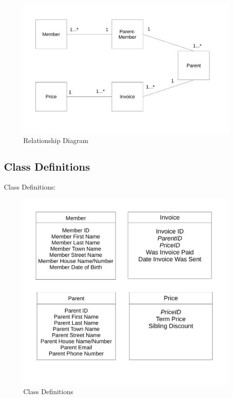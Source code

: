 \begin{figure}[H]
\includegraphics[width=\textwidth]{./Design/images/Relationship_Diagram.pdf}
    \caption{Relationship Diagram} \label{fig:Relationship Diagram}
\end{figure}

\subsection{Class Definitions}

Class Definitions:
\begin{figure}[H]
\includegraphics[width=\textwidth]{./Design/images/Class_definitions.pdf}
    \caption{Class Definitions} \label{fig:Interface Design}
\end{figure}

